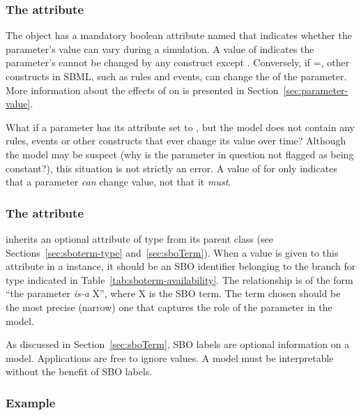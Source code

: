 \subsubsection{The  attribute}
\label{sec:parameter-constant}

The \Parameter object has a mandatory boolean attribute named
 that indicates whether the parameter's value can
vary during a simulation.  A value of  indicates the
parameter's  cannot be changed by any construct
except \InitialAssignment.  Conversely, if
=, other constructs in SBML, such as
rules and events, can change the  of the parameter.
More information about the effects of  on
 is presented in Section~\ref{sec:parameter-value}.

What if a parameter has its  attribute set to
, but the model does not contain any rules, events or
other constructs that ever change its value over time?  Although
the model may be suspect (why is the parameter in question not
flagged as being constant?), this situation is not strictly an
error.  A value of  for  only indicates
that a parameter \emph{can} change value, not that it \emph{must}.


\subsubsection{The  attribute}
\label{sec:parameter-sboterm}

\Parameter inherits an optional 
attribute of type  from its parent
class \SBase (see Sections~\ref{sec:sboterm-type}
and~\ref{sec:sboTerm}).  When a value is given to this
attribute in a \Parameter instance, it should be an
SBO identifier belonging to the branch for type \Parameter 
indicated in Table~\ref{tab:sboterm-availability}.  The relationship is
of the form ``the parameter \emph{is-a} X'', where X is
the SBO term.  The term chosen should be the most precise (narrow)
one that captures the role of the parameter in the model.

As discussed in Section~\ref{sec:sboTerm}, SBO labels are optional
information on a model.  Applications are free to ignore
 values.  A model must be interpretable without the
benefit of SBO labels.


\subsubsection{Example}


